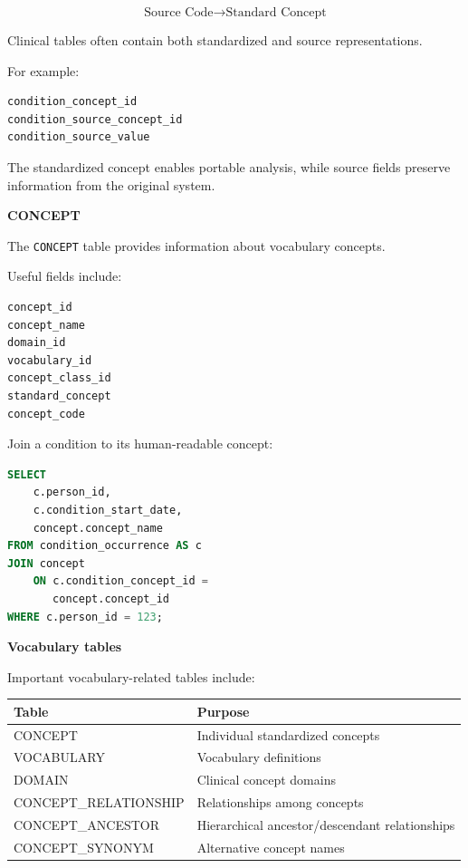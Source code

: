 \documentclass[11pt,letterpaper]{article}
\begin{document}
\[
\text{Source Code}
\rightarrow
\text{Standard Concept}
\]

Clinical tables often contain both standardized and source representations.

For example:

\begin{lstlisting}
condition_concept_id
condition_source_concept_id
condition_source_value
\end{lstlisting}

The standardized concept enables portable analysis, while source fields
preserve information from the original system.

\textbf{CONCEPT}

The \texttt{CONCEPT} table provides information about vocabulary concepts.

Useful fields include:

\begin{lstlisting}
concept_id
concept_name
domain_id
vocabulary_id
concept_class_id
standard_concept
concept_code
\end{lstlisting}

Join a condition to its human-readable concept:

\begin{lstlisting}[language=SQL]
SELECT
    c.person_id,
    c.condition_start_date,
    concept.concept_name
FROM condition_occurrence AS c
JOIN concept
    ON c.condition_concept_id =
       concept.concept_id
WHERE c.person_id = 123;
\end{lstlisting}

\textbf{Vocabulary tables}

Important vocabulary-related tables include:

\begin{center}
\begin{tabularx}{\textwidth}{lX}
\toprule
Table & Purpose \\
\midrule
CONCEPT & Individual standardized concepts \\
VOCABULARY & Vocabulary definitions \\
DOMAIN & Clinical concept domains \\
CONCEPT\_RELATIONSHIP & Relationships among concepts \\
CONCEPT\_ANCESTOR & Hierarchical ancestor/descendant relationships \\
CONCEPT\_SYNONYM & Alternative concept names \\
\bottomrule
\end{tabularx}
\end{center}
\end{document}
